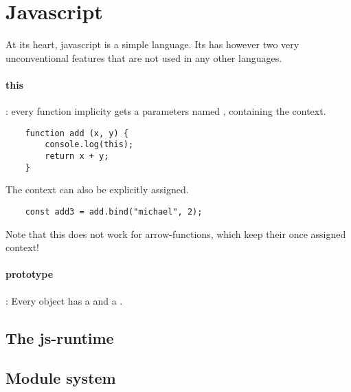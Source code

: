 \section{Javascript}
At its heart, javascript is a simple language. Its has however two very unconventional features that are not used in any other languages.  

 \paragraph{this}: every function implicity gets a parameters named , containing the context. 
\begin{lstlisting}
    function add (x, y) {
        console.log(this);
        return x + y;
    }
\end{lstlisting}
The context  can also be explicitly assigned.
\begin{lstlisting}
    const add3 = add.bind("michael", 2);
\end{lstlisting}
Note that this does not work for arrow-functions, which keep their once assigned context!


\paragraph{prototype}: Every object has a  and a .



\subsection{The js-runtime}

\subsection{Module system}

